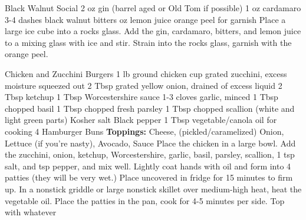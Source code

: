 \documentclass[12pt]{cookbook}
\begin{document}
\begin{recipe}{Black Walnut Social}
\ingredients
{2 oz gin (barrel aged or Old Tom if possible)}
{1 oz cardamaro}
{3-4 dashes black walnut bitters}
{ oz lemon juice}
{orange peel for garnish}
\stopingredients
\preparation
{Place a large ice cube into a rocks glass.}
{Add the gin, cardamaro, bitters, and lemon juice to a mixing glass with ice and stir.}
{Strain into the rocks glass, garnish with the orange peel.}
\stopprep
\end{recipe}
\begin{recipe}{Chicken and Zucchini Burgers}
\ingredients
{1 lb ground chicken}
{ cup grated zucchini, excess moisture squeezed out}
{2 Tbsp grated yellow onion, drained of excess liquid}
{2 Tbsp ketchup}
{1 Tbsp Worcestershire sauce}
{1-3 cloves garlic, minced}
{1 Tbsp chopped basil}
{1 Tbsp chopped fresh parsley}
{1 Tbsp chopped scallion (white and light green parts)}
{Kosher salt}
{Black pepper}
{1 Tbsp vegetable/canola oil for cooking}
{4 Hamburger Buns}
{\textbf{Toppings:} Cheese, (pickled/caramelized) Onion, Lettuce (if you're nasty), Avocado, Sauce}
\stopingredients
\preparation
{Place the chicken in a large bowl. Add the zucchini, onion, ketchup, Worcestershire, garlic, basil, parsley, scallion, 1 tsp salt, and  tsp pepper, and mix well.}
{Lightly coat hands with oil and form into 4 patties (they will be very wet.) Place uncovered in fridge for 15 minutes to firm up.}
{In a nonstick griddle or large nonstick skillet over medium-high heat, heat the vegetable oil. Place the patties in the pan, cook for 4-5 minutes per side.}
{Top with whatever}
\stopprep
\end{recipe}
\end{document}
